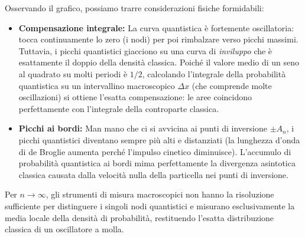Osservando il grafico, possiamo trarre considerazioni fisiche formidabili:
\begin{itemize}
    \item \textbf{Compensazione integrale:} La curva quantistica è fortemente oscillatoria: tocca continuamente lo zero (i nodi) per poi rimbalzare verso picchi massimi. Tuttavia, i picchi quantistici giacciono su una curva di \emph{inviluppo} che è esattamente il doppio della densità classica. Poiché il valore medio di un seno al quadrato su molti periodi è $1/2$, calcolando l'integrale della probabilità quantistica su un intervallino macroscopico $\Delta x$ (che comprende molte oscillazioni) si ottiene l'esatta compensazione: le aree coincidono perfettamente con l'integrale della controparte classica.
    \item \textbf{Picchi ai bordi:} Man mano che ci si avvicina ai punti di inversione $\pm A_n$, i picchi quantistici diventano sempre più alti e distanziati (la lunghezza d'onda di de Broglie aumenta perché l'impulso cinetico diminuisce). L'accumulo di probabilità quantistica ai bordi mima perfettamente la divergenza asintotica classica causata dalla velocità nulla della particella nei punti di inversione.
\end{itemize}
Per $n \to \infty$, gli strumenti di misura macroscopici non hanno la risoluzione sufficiente per distinguere i singoli nodi quantistici e misurano esclusivamente la media locale della densità di probabilità, restituendo l'esatta distribuzione classica di un oscillatore a molla.

